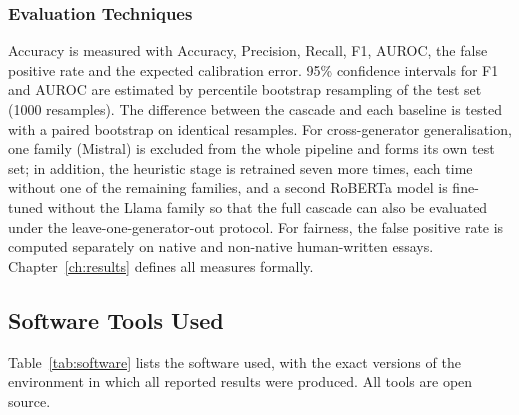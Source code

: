 \subsubsection{Evaluation Techniques}

Accuracy is measured with Accuracy, Precision, Recall, F1, AUROC, the false
positive rate and the expected calibration error. 95\% confidence intervals for
F1 and AUROC are estimated by percentile bootstrap resampling of the test set
(1000 resamples). The difference between the cascade and each baseline is
tested with a paired bootstrap on identical resamples. For cross-generator
generalisation, one family (Mistral) is excluded from the whole pipeline and
forms its own test set; in addition, the heuristic stage is retrained seven
more times, each time without one of the remaining families, and a second
RoBERTa model is fine-tuned without the Llama family so that the full cascade
can also be evaluated under the leave-one-generator-out protocol. For
fairness, the false positive rate is computed separately on native and
non-native human-written essays. Chapter~\ref{ch:results} defines all
measures formally.

\subsection{Software Tools Used}

Table~\ref{tab:software} lists the software used, with the exact versions of
the environment in which all reported results were produced. All tools are
open source.

